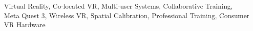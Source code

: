 \begin{IEEEkeywords}
Virtual Reality, Co-located VR, Multi-user Systems, Collaborative Training, Meta Quest 3, Wireless VR, Spatial Calibration, Professional Training, Consumer VR Hardware
\end{IEEEkeywords}
